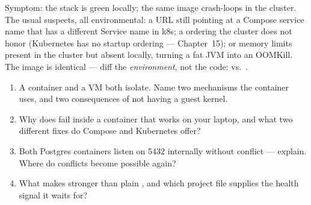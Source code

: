 \begin{pitfall}
Symptom: the stack is green locally; the same image crash-loops in the
cluster. The usual suspects, all environmental: a URL still pointing at
a Compose service name that has a different Service name in k8s; a
 ordering the cluster does not honor (Kubernetes has
no startup ordering --- Chapter~15); or memory limits present in the
cluster but absent locally, turning a fat JVM into an OOMKill. The
image is identical --- diff the \emph{environment}, not the code:
 vs.\ .
\end{pitfall}

\begin{quiz}
\begin{enumerate}
  \item A container and a VM both isolate. Name two mechanisms the
  container uses, and two consequences of not having a guest kernel.
  \item Why does  fail inside a container that
  works on your laptop, and what two different fixes do Compose and
  Kubernetes offer?
  \item Both Postgres containers listen on 5432 internally without
  conflict --- explain. Where do conflicts become possible again?
  \item What makes  stronger than
  plain , and which project file supplies the health
  signal it waits for?
\end{enumerate}
\end{quiz}
